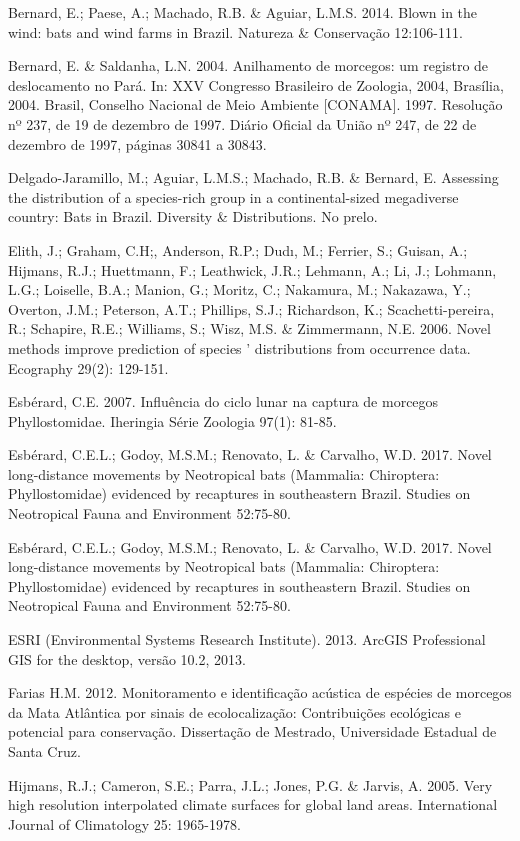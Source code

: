 \documentclass[
]{scrbook}
\begin{document}
Bernard, E.; Paese, A.; Machado, R.B. \& Aguiar, L.M.S. 2014. Blown in the wind: bats and wind farms in Brazil. Natureza \& Conservação 12:106-111.

Bernard, E. \& Saldanha, L.N. 2004. Anilhamento de morcegos: um registro de deslocamento no Pará. In: XXV Congresso Brasileiro de Zoologia, 2004, Brasília, 2004.
Brasil, Conselho Nacional de Meio Ambiente {[}CONAMA{]}. 1997. Resolução nº 237, de 19 de dezembro de 1997. Diário Oficial da União nº 247, de 22 de dezembro de 1997, páginas 30841 a 30843.

Delgado-Jaramillo, M.; Aguiar, L.M.S.; Machado, R.B. \& Bernard, E. Assessing the distribution of a species-rich group in a continental-sized megadiverse country: Bats in Brazil. Diversity \& Distributions. No prelo.

Elith, J.; Graham, C.H;, Anderson, R.P.; Dudı, M.; Ferrier, S.; Guisan, A.; Hijmans, R.J.; Huettmann, F.; Leathwick, J.R.; Lehmann, A.; Li, J.; Lohmann, L.G.; Loiselle, B.A.; Manion, G.; Moritz, C.; Nakamura, M.; Nakazawa, Y.; Overton, J.M.; Peterson, A.T.; Phillips, S.J.; Richardson, K.; Scachetti-pereira, R.; Schapire, R.E.; Williams, S.; Wisz, M.S. \& Zimmermann, N.E. 2006. Novel methods improve prediction of species ' distributions from occurrence data. Ecography 29(2): 129-151.

Esbérard, C.E. 2007. Influência do ciclo lunar na captura de morcegos Phyllostomidae. Iheringia Série Zoologia 97(1): 81-85.

Esbérard, C.E.L.; Godoy, M.S.M.; Renovato, L. \& Carvalho, W.D. 2017. Novel long-distance movements by Neotropical bats (Mammalia: Chiroptera: Phyllostomidae) evidenced by recaptures in southeastern Brazil. Studies on Neotropical Fauna and Environment 52:75-80.

Esbérard, C.E.L.; Godoy, M.S.M.; Renovato, L. \& Carvalho, W.D. 2017. Novel long-distance movements by Neotropical bats (Mammalia: Chiroptera: Phyllostomidae) evidenced by recaptures in southeastern Brazil. Studies on Neotropical Fauna and Environment 52:75-80.

ESRI (Environmental Systems Research Institute). 2013. ArcGIS Professional GIS for the desktop, versão 10.2, 2013.

Farias H.M. 2012. Monitoramento e identificação acústica de espécies de morcegos da Mata Atlântica por sinais de ecolocalização: Contribuições ecológicas e potencial para conservação. Dissertação de Mestrado, Universidade Estadual de Santa Cruz.

Hijmans, R.J.; Cameron, S.E.; Parra, J.L.; Jones, P.G. \& Jarvis, A. 2005. Very high resolution interpolated climate surfaces for global land areas. International Journal of Climatology 25: 1965-1978.
\end{document}
